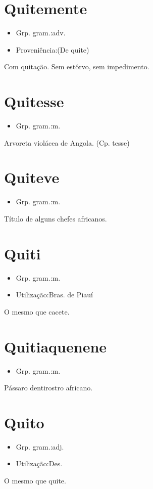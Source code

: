 \section{Quitemente}
\begin{itemize}
\item {Grp. gram.:adv.}
\end{itemize}
\begin{itemize}
\item {Proveniência:(De \textunderscore quite\textunderscore )}
\end{itemize}
Com quitação.
Sem estôrvo, sem impedimento.
\section{Quitesse}
\begin{itemize}
\item {Grp. gram.:m.}
\end{itemize}
Arvoreta violácea de Angola.
(Cp. \textunderscore tesse\textunderscore )
\section{Quiteve}
\begin{itemize}
\item {Grp. gram.:m.}
\end{itemize}
Título de alguns chefes africanos.
\section{Quiti}
\begin{itemize}
\item {Grp. gram.:m.}
\end{itemize}
\begin{itemize}
\item {Utilização:Bras. de Piauí}
\end{itemize}
O mesmo que \textunderscore cacete\textunderscore .
\section{Quitiaquenene}
\begin{itemize}
\item {Grp. gram.:m.}
\end{itemize}
Pássaro dentirostro africano.
\section{Quito}
\begin{itemize}
\item {Grp. gram.:adj.}
\end{itemize}
\begin{itemize}
\item {Utilização:Des.}
\end{itemize}
O mesmo que \textunderscore quite\textunderscore .
